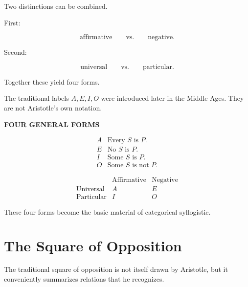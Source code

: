 \documentclass[11pt]{article}
\begin{document}
Two distinctions can be combined.

First:

\[
\text{affirmative}
\qquad\text{vs.}\qquad
\text{negative}.
\]

Second:

\[
\text{universal}
\qquad\text{vs.}\qquad
\text{particular}.
\]

Together these yield four forms.

The traditional labels \(A,E,I,O\) were introduced later in the
Middle Ages. They are not Aristotle's own notation.

\begin{whiteboard}
\textbf{FOUR GENERAL FORMS}

\[
\begin{array}{cl}
A & \text{Every }S\text{ is }P.\\[0.3em]
E & \text{No }S\text{ is }P.\\[0.3em]
I & \text{Some }S\text{ is }P.\\[0.3em]
O & \text{Some }S\text{ is not }P.
\end{array}
\]

\vspace{0.5em}

\[
\begin{array}{c|cc}
 & \text{Affirmative} & \text{Negative}\\
\hline
\text{Universal} & A & E\\
\text{Particular} & I & O
\end{array}
\]
\end{whiteboard}

These four forms become the basic material of categorical
syllogistic.

\section{The Square of Opposition}

The traditional square of opposition is not itself drawn by
Aristotle, but it conveniently summarizes relations that he
recognizes.

\begin{center}
\end{center}
\end{document}

